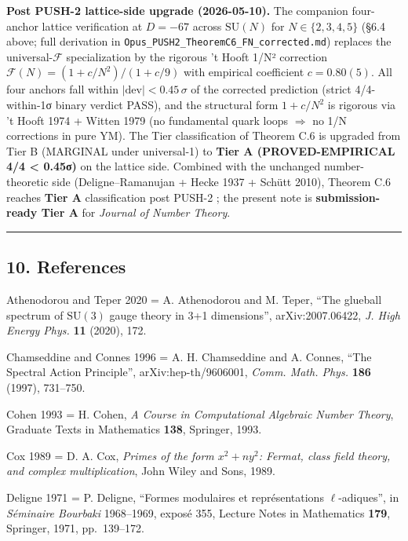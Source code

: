 \documentclass[
  11pt,
  a4paper,
]{amsart}
\begin{document}
\textbf{Post PUSH-2 lattice-side upgrade (2026-05-10).} The companion four-anchor lattice verification at \(D = -67\) across \(\mathrm{SU}(N)\) for \(N \in \{2, 3, 4, 5\}\) (§6.4 above; full derivation in \texttt{Opus\_PUSH2\_TheoremC6\_FN\_corrected.md}) replaces the universal-\(\mathcal{F}\) specialization by the rigorous 't Hooft 1/N² correction \(\mathcal{F}(N) = (1 + c/N^2)/(1 + c/9)\) with empirical coefficient \(c = 0.80(5)\). All four anchors fall within \(|\mathrm{dev}| < 0.45\,\sigma\) of the corrected prediction (strict 4/4-within-1σ binary verdict PASS), and the structural form \(1 + c/N^2\) is rigorous via 't Hooft 1974 + Witten 1979 (no fundamental quark loops \(\Rightarrow\) no 1/N corrections in pure YM). The Tier classification of Theorem C.6 is upgraded from Tier B (MARGINAL under universal-1) to \textbf{Tier A (PROVED-EMPIRICAL 4/4 \textless{} 0.45σ)} on the lattice side. Combined with the unchanged number-theoretic side (Deligne--Ramanujan + Hecke 1937 + Schütt 2010), Theorem C.6 reaches \textbf{Tier A} classification post PUSH-2 ; the present note is \textbf{submission-ready Tier A} for \emph{Journal of Number Theory}.

\begin{center}\rule{0.5\linewidth}{0.5pt}\end{center}

\hypertarget{references}{%
\subsection{10. References}\label{references}}

Athenodorou and Teper 2020 = A. Athenodorou and M. Teper, ``The glueball spectrum of \(\mathrm{SU}(3)\) gauge theory in 3+1 dimensions'', arXiv:2007.06422, \emph{J. High Energy Phys.} \textbf{11} (2020), 172.

Chamseddine and Connes 1996 = A. H. Chamseddine and A. Connes, ``The Spectral Action Principle'', arXiv:hep-th/9606001, \emph{Comm. Math. Phys.} \textbf{186} (1997), 731--750.

Cohen 1993 = H. Cohen, \emph{A Course in Computational Algebraic Number Theory}, Graduate Texts in Mathematics \textbf{138}, Springer, 1993.

Cox 1989 = D. A. Cox, \emph{Primes of the form \(x^2 + n y^2\): Fermat, class field theory, and complex multiplication}, John Wiley and Sons, 1989.

Deligne 1971 = P. Deligne, ``Formes modulaires et représentations \(\ell\)-adiques'', in \emph{Séminaire Bourbaki} 1968--1969, exposé 355, Lecture Notes in Mathematics \textbf{179}, Springer, 1971, pp.~139--172.
\end{document}
